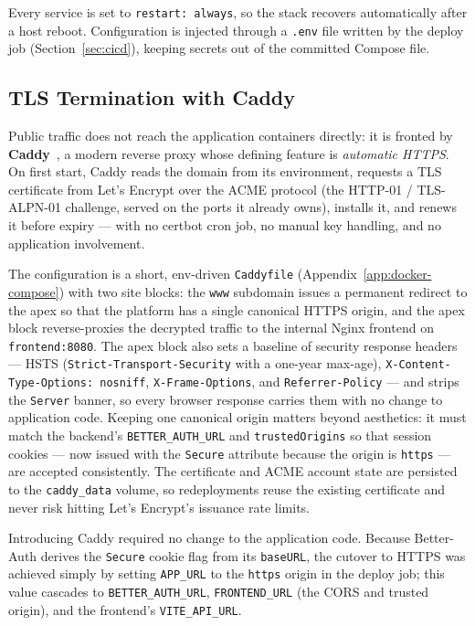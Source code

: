 \documentclass[12pt, a4paper, oneside]{report}
\begin{document}
Every service is set to \texttt{restart: always}, so the stack
recovers automatically after a host reboot. Configuration is injected
through a \texttt{.env} file written by the deploy job
(Section~\ref{sec:cicd}), keeping secrets out of the committed
Compose file.

\subsection{TLS Termination with Caddy}
\label{sec:tls-caddy}

Public traffic does not reach the application containers directly: it
is fronted by \textbf{Caddy}~\cite{caddy}, a modern reverse proxy whose defining
feature is \emph{automatic HTTPS}. On first start, Caddy reads the
domain from its environment, requests a TLS certificate from Let's
Encrypt over the ACME protocol (the HTTP-01 / TLS-ALPN-01 challenge,
served on the ports it already owns), installs it, and renews it
before expiry --- with no certbot cron job, no manual key handling,
and no application involvement.

The configuration is a short, env-driven \texttt{Caddyfile}
(Appendix~\ref{app:docker-compose}) with two site blocks: the
\texttt{www} subdomain issues a permanent redirect to the apex so
that the platform has a single canonical HTTPS origin, and the apex
block reverse-proxies the decrypted traffic to the internal Nginx
frontend on \texttt{frontend:8080}. The apex block also sets a baseline
of security response headers --- HSTS (\texttt{Strict-Transport-Security}
with a one-year max-age), \texttt{X-Content-Type-Options: nosniff},
\texttt{X-Frame-Options}, and \texttt{Referrer-Policy} --- and strips
the \texttt{Server} banner, so every browser response carries them with
no change to application code. Keeping one canonical origin matters
beyond aesthetics: it must match the backend's \texttt{BETTER\_AUTH\_URL}
and \texttt{trustedOrigins} so that session cookies --- now issued with
the \texttt{Secure} attribute because the origin is \texttt{https} ---
are accepted consistently. The certificate and ACME account state are
persisted to the \texttt{caddy\_data} volume, so redeployments reuse
the existing certificate and never risk hitting Let's Encrypt's
issuance rate limits.

Introducing Caddy required no change to the application code. Because
Better-Auth derives the \texttt{Secure} cookie flag from its
\texttt{baseURL}, the cutover to HTTPS was achieved simply by setting
\texttt{APP\_URL} to the \texttt{https} origin in the deploy job; this
value cascades to \texttt{BETTER\_AUTH\_URL}, \texttt{FRONTEND\_URL}
(the CORS and trusted origin), and the frontend's \texttt{VITE\_API\_URL}.
\end{document}
